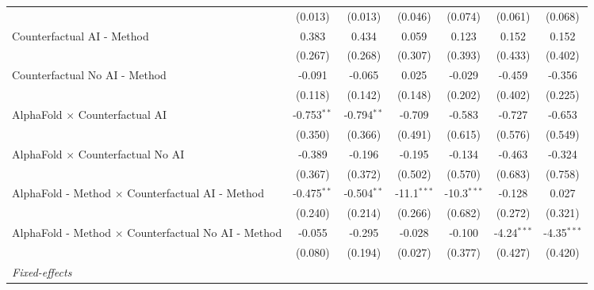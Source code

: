 \begin{tabular}{lcccccc}
                                                              & (0.013)       & (0.013)        & (0.046)       & (0.074)       & (0.061)       & (0.068)\\   
   Counterfactual AI - Method                                 & 0.383         & 0.434          & 0.059         & 0.123         & 0.152         & 0.152\\   
                                                              & (0.267)       & (0.268)        & (0.307)       & (0.393)       & (0.433)       & (0.402)\\   
   Counterfactual No AI - Method                              & -0.091        & -0.065         & 0.025         & -0.029        & -0.459        & -0.356\\   
                                                              & (0.118)       & (0.142)        & (0.148)       & (0.202)       & (0.402)       & (0.225)\\   
   AlphaFold $\times$ Counterfactual AI                       & -0.753$^{**}$ & -0.794$^{**}$  & -0.709        & -0.583        & -0.727        & -0.653\\   
                                                              & (0.350)       & (0.366)        & (0.491)       & (0.615)       & (0.576)       & (0.549)\\   
   AlphaFold $\times$ Counterfactual No AI                    & -0.389        & -0.196         & -0.195        & -0.134        & -0.463        & -0.324\\   
                                                              & (0.367)       & (0.372)        & (0.502)       & (0.570)       & (0.683)       & (0.758)\\   
   AlphaFold - Method $\times$ Counterfactual AI - Method     & -0.475$^{**}$ & -0.504$^{**}$  & -11.1$^{***}$ & -10.3$^{***}$ & -0.128        & 0.027\\   
                                                              & (0.240)       & (0.214)        & (0.266)       & (0.682)       & (0.272)       & (0.321)\\   
   AlphaFold - Method $\times$ Counterfactual No AI - Method  & -0.055        & -0.295         & -0.028        & -0.100        & -4.24$^{***}$ & -4.35$^{***}$\\   
                                                              & (0.080)       & (0.194)        & (0.027)       & (0.377)       & (0.427)       & (0.420)\\   
   \midrule
   \emph{Fixed-effects}\\

\end{tabular}
